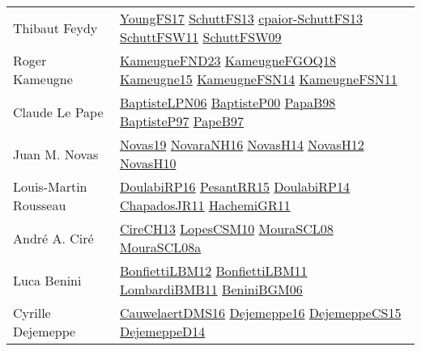 {\begin{longtable}{p{4cm}p{20cm}}
Thibaut Feydy & \href{papers/YoungFS17.pdf}{YoungFS17}\cite{YoungFS17} \href{papers/SchuttFS13.pdf}{SchuttFS13}\cite{SchuttFS13} \href{papers/cpaior-SchuttFS13.pdf}{cpaior-SchuttFS13}\cite{cpaior-SchuttFS13} \href{articles/SchuttFSW11.pdf}{SchuttFSW11}\cite{SchuttFSW11} \href{papers/SchuttFSW09.pdf}{SchuttFSW09}\cite{SchuttFSW09} \\
Roger Kameugne & \href{papers/KameugneFND23.pdf}{KameugneFND23}\cite{KameugneFND23} \href{papers/KameugneFGOQ18.pdf}{KameugneFGOQ18}\cite{KameugneFGOQ18} \href{articles/Kameugne15.pdf}{Kameugne15}\cite{Kameugne15} \href{articles/KameugneFSN14.pdf}{KameugneFSN14}\cite{KameugneFSN14} \href{papers/KameugneFSN11.pdf}{KameugneFSN11}\cite{KameugneFSN11} \\
Claude Le Pape & \href{}{BaptisteLPN06}\cite{BaptisteLPN06} \href{articles/BaptisteP00.pdf}{BaptisteP00}\cite{BaptisteP00} \href{articles/PapaB98.pdf}{PapaB98}\cite{PapaB98} \href{papers/BaptisteP97.pdf}{BaptisteP97}\cite{BaptisteP97} \href{papers/PapeB97.pdf}{PapeB97}\cite{PapeB97} \\
Juan M. Novas & \href{articles/Novas19.pdf}{Novas19}\cite{Novas19} \href{articles/NovaraNH16.pdf}{NovaraNH16}\cite{NovaraNH16} \href{articles/NovasH14.pdf}{NovasH14}\cite{NovasH14} \href{articles/NovasH12.pdf}{NovasH12}\cite{NovasH12} \href{articles/NovasH10.pdf}{NovasH10}\cite{NovasH10} \\
Louis{-}Martin Rousseau & \href{articles/DoulabiRP16.pdf}{DoulabiRP16}\cite{DoulabiRP16} \href{papers/PesantRR15.pdf}{PesantRR15}\cite{PesantRR15} \href{papers/DoulabiRP14.pdf}{DoulabiRP14}\cite{DoulabiRP14} \href{papers/ChapadosJR11.pdf}{ChapadosJR11}\cite{ChapadosJR11} \href{articles/HachemiGR11.pdf}{HachemiGR11}\cite{HachemiGR11} \\
Andr{\'{e}} A. Cir{\'{e}} & \href{papers/CireCH13.pdf}{CireCH13}\cite{CireCH13} \href{articles/LopesCSM10.pdf}{LopesCSM10}\cite{LopesCSM10} \href{papers/MouraSCL08.pdf}{MouraSCL08}\cite{MouraSCL08} \href{papers/MouraSCL08a.pdf}{MouraSCL08a}\cite{MouraSCL08a} \\
Luca Benini & \href{papers/BonfiettiLBM12.pdf}{BonfiettiLBM12}\cite{BonfiettiLBM12} \href{papers/BonfiettiLBM11.pdf}{BonfiettiLBM11}\cite{BonfiettiLBM11} \href{papers/LombardiBMB11.pdf}{LombardiBMB11}\cite{LombardiBMB11} \href{papers/BeniniBGM06.pdf}{BeniniBGM06}\cite{BeniniBGM06} \\
Cyrille Dejemeppe & \href{papers/CauwelaertDMS16.pdf}{CauwelaertDMS16}\cite{CauwelaertDMS16} \href{}{Dejemeppe16}\cite{Dejemeppe16} \href{papers/DejemeppeCS15.pdf}{DejemeppeCS15}\cite{DejemeppeCS15} \href{papers/DejemeppeD14.pdf}{DejemeppeD14}\cite{DejemeppeD14} \\

\end{longtable}}
